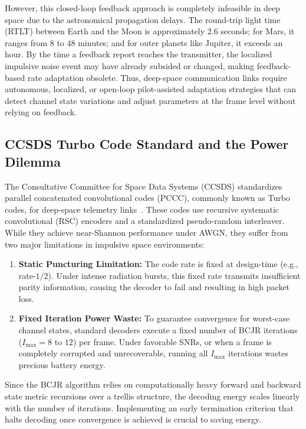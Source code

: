 \documentclass[journal,twocolumn]{IEEEtran}
\begin{document}
However, this closed-loop feedback approach is completely infeasible in deep space due to the astronomical propagation delays. The round-trip light time (RTLT) between Earth and the Moon is approximately $2.6$ seconds; for Mars, it ranges from $8$ to $48$ minutes; and for outer planets like Jupiter, it exceeds an hour. By the time a feedback report reaches the transmitter, the localized impulsive noise event may have already subsided or changed, making feedback-based rate adaptation obsolete. Thus, deep-space communication links require autonomous, localized, or open-loop pilot-assisted adaptation strategies that can detect channel state variations and adjust parameters at the frame level without relying on feedback.

\subsection{CCSDS Turbo Code Standard and the Power Dilemma}
The Consultative Committee for Space Data Systems (CCSDS) standardizes parallel concatenated convolutional codes (PCCC), commonly known as Turbo codes, for deep-space telemetry links~\cite{ccsds2010turbo}. These codes use recursive systematic convolutional (RSC) encoders and a standardized pseudo-random interleaver. While they achieve near-Shannon performance under AWGN, they suffer from two major limitations in impulsive space environments:
\begin{enumerate}
  \item \textbf{Static Puncturing Limitation:} The code rate is fixed at design-time (e.g., rate-$1/2$). Under intense radiation bursts, this fixed rate transmits insufficient parity information, causing the decoder to fail and resulting in high packet loss.
  \item \textbf{Fixed Iteration Power Waste:} To guarantee convergence for worst-case channel states, standard decoders execute a fixed number of BCJR iterations ($I_{\max} = 8$ to $12$) per frame. Under favorable SNRs, or when a frame is completely corrupted and unrecoverable, running all $I_{\max}$ iterations wastes precious battery energy.
\end{enumerate}
Since the BCJR algorithm relies on computationally heavy forward and backward state metric recursions over a trellis structure, the decoding energy scales linearly with the number of iterations. Implementing an early termination criterion that halts decoding once convergence is achieved is crucial to saving energy.
\end{document}
